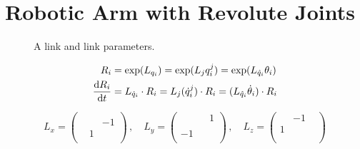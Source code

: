 \chapter{Robotic Arm with Revolute Joints}

\begin{figure}
    \begin{center}
        
        \caption{A link and link parameters.}
    \end{center}
\end{figure}




{
\tiny

\begin{align*}
    R_i
        &= \exp(L_{q_i}) = \exp(L_j q^j_i) = \exp(L_{\hat{q}_i} \theta_i) \\
    \frac{\operatorname{d\!} R_i}{\operatorname{d\!} t}
        &= L_{\dot{q}_i} \cdot R_i = L_j (\dot{q}^j_i) \cdot R_i = (L_{\hat{q}_i} \dot{\theta}_i) \cdot R_i
\end{align*}

\begin{equation*}
    L_x =
    \begin{pmatrix}
           &    &    \\
           &    & -1 \\
           &  1 &    \\
    \end{pmatrix} \,,\quad
    L_y =
    \begin{pmatrix}
           &    &  1 \\
           &    &    \\
        -1 &    &    \\
    \end{pmatrix} \,,\quad
    L_z =
    \begin{pmatrix}
           & -1 &    \\
         1 &    &    \\
           &    &    \\
    \end{pmatrix}
\end{equation*}

}
